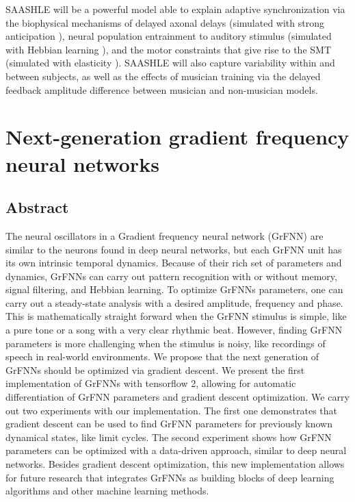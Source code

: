 \documentclass{report}
\begin{document}
SAASHLE will be a powerful model able to explain adaptive synchronization via the biophysical mechanisms of delayed axonal delays (simulated with strong anticipation \cite{stepp2010strong}), neural population entrainment to auditory stimulus (simulated with Hebbian learning \cite{righetti2006dynamic}), and the motor constraints that give rise to the SMT (simulated with elasticity \cite{lambert2016adaptive}). SAASHLE will also capture variability within and between subjects, as well as the effects of musician training via the delayed feedback amplitude difference between musician and non-musician models. 


\chapter{Next-generation gradient frequency neural networks}

\section{Abstract}
The neural oscillators in a Gradient frequency neural network (GrFNN) are similar to the neurons found in deep neural networks, but each GrFNN unit has its own intrinsic temporal dynamics. Because of their rich set of parameters and dynamics, GrFNNs can carry out pattern recognition with or without memory, signal filtering, and Hebbian learning. To optimize GrFNNs parameters, one can carry out a steady-state analysis with a desired amplitude, frequency and phase. This is mathematically straight forward when the GrFNN stimulus is simple, like a pure tone or a song with a very clear rhythmic beat. However, finding GrFNN parameters is more challenging when the stimulus is noisy, like recordings of speech in real-world environments. We propose that the next generation of GrFNNs should be optimized via gradient descent. We present the first implementation of GrFNNs with tensorflow 2, allowing for automatic differentiation of GrFNN parameters and gradient descent optimization. We carry out two experiments with our implementation. The first one demonstrates that gradient descent can be used to find GrFNN parameters for previously known dynamical states, like limit cycles. The second experiment shows how GrFNN parameters can be optimized with a data-driven approach, similar to deep neural networks. Besides gradient descent optimization, this new implementation allows for future research that integrates GrFNNs as building blocks of deep learning algorithms and other machine learning methods.
\end{document}

